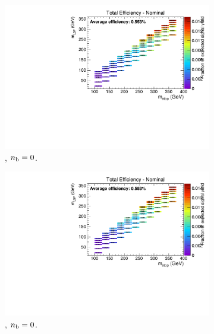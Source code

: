 \begin{figure}[ht!]
  \centering
  \begin{subfigure}[b]{0.32\textwidth}
    \includegraphics[width=\textwidth, page=4]{Figs/sms/t2cc/v24/ISR_T2cc_v24_eq0b_le3j_incl.pdf}
    \caption{\njlow, $n_{\text{b}} = 0$.}
  \end{subfigure}
  \begin{subfigure}[b]{0.32\textwidth}
    \includegraphics[width=\textwidth, page=5]{Figs/sms/t2cc/v24/ISR_T2cc_v24_eq0b_le3j_incl.pdf}
    \caption{\njlow, $n_{\text{b}} = 0$.}
  \end{subfigure}
  \begin{subfigure}[b]{0.32\textwidth}

\end{subfigure}
\end{figure}
